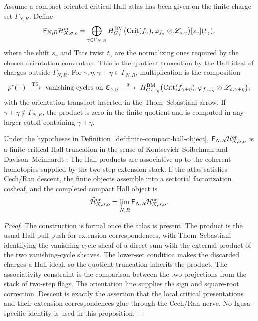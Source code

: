 \begin{definition}
\label{def:finite-compact-hall-object}
Assume a compact oriented critical Hall atlas has been given on the
finite charge set \(\Gamma_{N,R}\).  Define
\[
  \mathsf F_{N,R}\mathcal H^{\mathrm{or}}_{X,\sigma,o}
  =
  \bigoplus_{\gamma\in\Gamma_{N,R}}
  H^{\operatorname{BM}}_{G_{\gamma}}
  \bigl(\operatorname{Crit}(f_{\gamma}),\varphi_{f_\gamma}\otimes
  \mathscr L_{o,\gamma}\bigr)[s_\gamma](t_\gamma),
\]
where the shift \(s_\gamma\) and Tate twist \(t_\gamma\) are the
normalizing ones required by the chosen orientation convention.  This is
the quotient truncation by the Hall ideal of charges outside
\(\Gamma_{N,R}\).  For
\(\gamma,\eta,\gamma+\eta\in\Gamma_{N,R}\), multiplication is the
composition
\[
  p^*(-)\ \xrightarrow{\mathrm{TS}}\ 
  \text{vanishing cycles on }\mathfrak E_{\gamma,\eta}
  \ \xrightarrow{\ q_!\ }\ 
  H^{\BM}_{G_{\gamma+\eta}}
  \bigl(\Crit(f_{\gamma+\eta}),\van_{f_{\gamma+\eta}}\otimes
  \mathscr L_{o,\gamma+\eta}\bigr),
\]
with the orientation transport inserted in the Thom--Sebastiani arrow.
If \(\gamma+\eta\notin\Gamma_{N,R}\), the product is zero in the
finite quotient and is computed in any larger cutoff containing
\(\gamma+\eta\).
\end{definition}

\begin{proposition}
\label{prop:compact-hall-atlas-constructs}
Under the hypotheses in Definition~\ref{def:finite-compact-hall-object},
\(\mathsf F_{N,R}\mathcal H^{\mathrm{or}}_{X,\sigma,o}\) is a finite
critical Hall truncation in the sense of Kontsevich--Soibelman
\cite{KSCoHA} and Davison--Meinhardt \cite{DavisonMeinhardtCoHA}.  The
Hall products are associative up to the
coherent homotopies supplied by the two-step extension stack.  If the
atlas satisfies Cech/Ran descent, the finite objects assemble into a
sectorial factorization cosheaf, and the completed compact Hall object is
\[
  \widehat{\mathcal H}^{\mathrm{or}}_{X,\sigma,o}
  =
  \varprojlim_{N,R}
  \mathsf F_{N,R}\mathcal H^{\mathrm{or}}_{X,\sigma,o}.
\]
\end{proposition}

\begin{proof}
The construction is formal once the atlas is present.  The product is
the usual Hall pull-push for extension correspondences, with
Thom--Sebastiani identifying the vanishing-cycle sheaf of a direct sum
with the external product of the two vanishing-cycle sheaves.  The
lower-set condition makes the discarded charges a Hall ideal, so the
quotient truncation inherits the product.  The
associativity constraint is the comparison between the two projections
from the stack of two-step flags.  The orientation line supplies the
sign and square-root correction.  Descent is exactly the assertion that
the local critical presentations and their extension correspondences
glue through the Cech/Ran nerve.  No Igusa-specific identity is used in
this proposition.
\end{proof}

